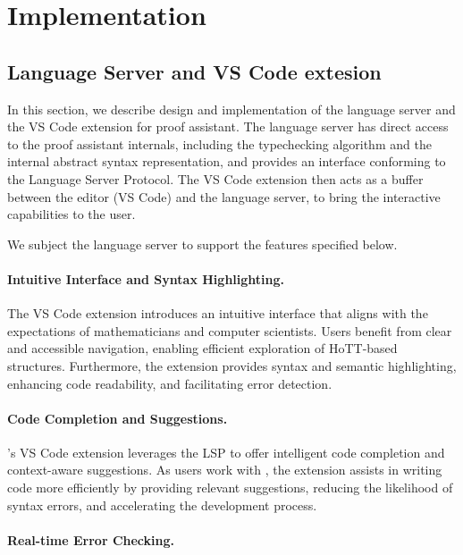 \chapter{Implementation}
\label{chap:impl}

\section{\Rzk{} Language Server and VS Code extesion}

In this section, we describe design and implementation of the language server
and the VS Code extension for \Rzk{} proof assistant.
The language server has direct access to the proof assistant internals,
including the typechecking algorithm and the internal abstract syntax representation,
and provides an interface conforming to the Language Server Protocol.
The VS Code extension then acts as a buffer between the editor (VS Code)
and the language server, to bring the interactive capabilities to the user.

We subject the language server to support the features specified below.

\subsubsection{Intuitive Interface and Syntax Highlighting.}

The VS Code extension introduces an intuitive interface that aligns with
the expectations of mathematicians and computer scientists.
Users benefit from clear and accessible navigation,
enabling efficient exploration of HoTT-based structures.
Furthermore, the extension provides syntax and semantic highlighting,
enhancing code readability, and facilitating error detection.

\subsubsection{Code Completion and Suggestions.}

\Rzk{}'s VS Code extension leverages the LSP to offer intelligent code completion
and context-aware suggestions. As users work with \Rzk{}, the extension assists
in writing code more efficiently by providing relevant suggestions, reducing
the likelihood of syntax errors, and accelerating the development process.

\subsubsection{Real-time Error Checking.}

